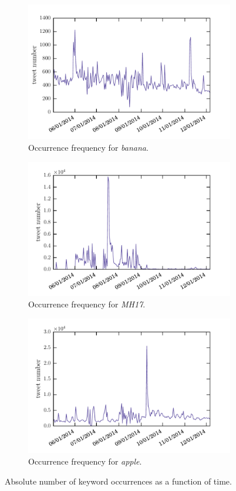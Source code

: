 \documentclass[12pt, a4paper]{article}
\begin{document}
\begin{figure}
\centering
\begin{subfigure}{.5\textwidth}
  \centering
  \includegraphics[width=.7\linewidth]{figs/banana_absolute.pdf}
  \caption{Occurrence frequency for \textit{banana}.}
  \label{fig:sub11}
\end{subfigure}%
\begin{subfigure}{.5\textwidth}
  \centering
  \includegraphics[width=.7\linewidth]{figs/mh17_absolute.pdf}
  \caption{Occurrence frequency for \textit{MH17}.}
  \label{fig:sub12}
\end{subfigure}
\begin{subfigure}{.5\textwidth}
  \centering
  \includegraphics[width=.7\linewidth]{figs/apple_absolute.pdf}
  \caption{Occurrence frequency for \textit{apple}.}
  \label{fig:sub13}
\end{subfigure}
\caption{Absolute number of keyword occurrences as a function of time.}
\label{fig:timeseries_abs}
\end{figure}
\end{document}
